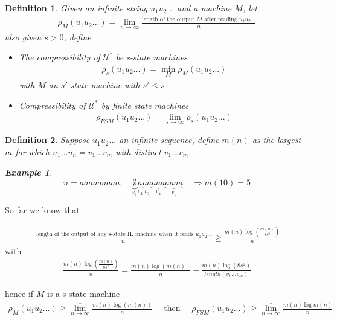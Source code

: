 \documentclass[twoside]{article}
\newtheorem{definition}{Definition}[section]
\theoremstyle{definition} %
\newtheorem{example}{Example}
\def\U{\mathcal{U}}
\begin{document}
\begin{definition}
  Given an infinite string $u_1 u_2 ...$ and a machine $M$, let
  \begin{align*}
    \rho_{M}(u_1 u_2 ...) = \overline{\lim_{n \to \infty}} \frac{\text{length of the output } M \text{ after reading } u_1 u_2...}{n}
  \end{align*}
  also given $s > 0$, define
  \begin{itemize}
    \item The compressibility of $\U^*$ be s-state machines
    \begin{align*}
      \rho_s (u_1 u_2 ...) = \min_{M} \rho_{M}(u_1 u_2 ...)
    \end{align*}
    with $M$ an $s'$-state machine with $s' \leq s$
    \item Compressibility of $\U^*$ by finite state machines
    \begin{align*}
      \rho_{FSM} (u_1 u_2 ...) = \lim_{s \to \infty} \rho_s (u_1 u_2 ...)
    \end{align*}
  \end{itemize}
\end{definition}

\begin{definition}
  Suppose $u_1 u_2 ...$ an infinite sequence, define $m(n)$ as the largest $m$ for which $u_1 ... u_n = v_1 ... v_m$ with distinct $v_1 ... v_m$
  \begin{example}
    $$ u = aaaaaaaaa, \quad \underbrace{\emptyset}_{v_1} \underbrace{a}_{v_2} \underbrace{aa}_{v_3} \underbrace{aaa}_{v_4} \underbrace{aaaa}_{v_5} \quad \Rightarrow m(10) = 5 $$
  \end{example}
\end{definition}

So far we know that

\begin{align*}
  \frac{\text{ length of the output of any s-state IL machine when it reads } u_1 u_2 ... }{n} \geq \frac{m(n) \log(\frac{m(n)}{8 s^2})}{n}
\end{align*}
with
\begin{align*}
  \frac{m(n) \log(\frac{m(n)}{8 s^2})}{n} = \frac{m(n) \log(m(n))}{n} - \frac{m(n) \log(8 s^2)}{length(v_1 ... v_m)}
\end{align*}

hence if $M$ is a s-state machine
\begin{align*}
  \rho_M (u_1 u_2 ...) \geq \overline{\lim_{n \to \infty}} \frac{m(n) \log(m(n))}{n}
  \quad \text{ then } \quad
  \rho_{FSM} (u_1 u_2 ...) \geq \overline{\lim_{n \to \infty}} \frac{m(n) \log m(n)}{n}
\end{align*}
\end{document}
